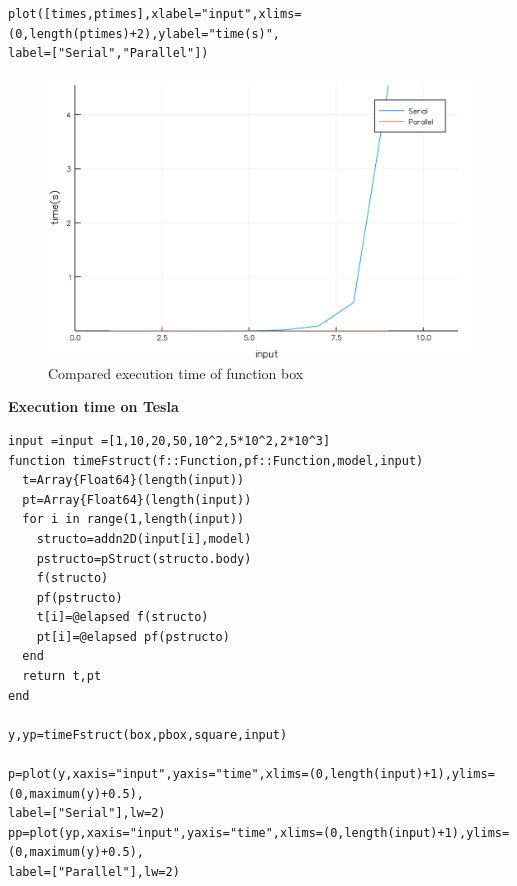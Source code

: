 \documentclass[a4paper,12pt]{article}
\begin{document}
\noindent {}
\begin{Verbatim}[fontsize=\footnotesize]
plot([times,ptimes],xlabel="input",xlims=(0,length(ptimes)+2),ylabel="time(s)",
label=["Serial","Parallel"])
\end{Verbatim}
\begin{figure}[!h]
\centering
\includegraphics[scale=0.08]{boxC.png}
\caption{Compared execution time of function box}
\end{figure}
\newpage
\noindent\textbf{Execution time on Tesla}
\begin{Verbatim}[fontsize=\footnotesize]
input =input =[1,10,20,50,10^2,5*10^2,2*10^3]
function timeFstruct(f::Function,pf::Function,model,input)
  t=Array{Float64}(length(input))
  pt=Array{Float64}(length(input))
  for i in range(1,length(input))
    structo=addn2D(input[i],model)
    pstructo=pStruct(structo.body)
    f(structo)
    pf(pstructo)
    t[i]=@elapsed f(structo)
    pt[i]=@elapsed pf(pstructo)
  end
  return t,pt
end

y,yp=timeFstruct(box,pbox,square,input)

p=plot(y,xaxis="input",yaxis="time",xlims=(0,length(input)+1),ylims=(0,maximum(y)+0.5),
label=["Serial"],lw=2)
pp=plot(yp,xaxis="input",yaxis="time",xlims=(0,length(input)+1),ylims=(0,maximum(y)+0.5),
label=["Parallel"],lw=2)
\end{Verbatim}
\end{document}

